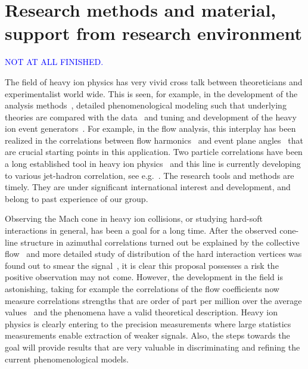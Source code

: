 \section{Research methods and material, support from research environment} %
\label{sec:researchmethods}

\textcolor{blue}{NOT AT ALL FINISHED.}

The field of heavy ion physics has very vivid cross talk between theoreticians and experimentalist world wide. This is seen, for example, in the development of the analysis methods~\cite{Poskanzer:1998yz,Bilandzic:2010jr}, detailed phenomenological modeling such that underlying theories are compared with the data~\cite{Burke:2013yra,Renk:2011gj,Niemi:2015qia} and tuning and development of the heavy ion event generators~\cite{Gyulassy:1994ew,Lin:2004en,Lokhtin2006}. For example, in the flow analysis, this interplay has been realized in the correlations between flow harmonics~\cite{Poskanzer:1998yz,ALICE:2011ab} and event plane angles~\cite{Aad:2014fla,Bhalerao:2014xra} that are crucial starting points in this application. Two particle correlations have been a long established tool in heavy ion physics~\cite{PhysRevLett.95.152301,PhysRevLett.97.052301} and this line is currently developing to various jet-hadron correlation, see e.g.~\cite{Khachatryan:2016tfj}. The research tools and methods are timely. They are under significant international interest and development, and belong to past experience of our group.

Observing the Mach cone in heavy ion collisions, or studying hard-soft interactions in general, has been a goal for a long time. After the observed cone-line structure in azimuthal correlations turned out be explained by the collective flow~\cite{ALICE:2011ab} and more detailed study of distribution of the hard interaction vertices was found out to smear the signal~\cite{Tachibana:2015qxa}, it is clear this proposal possesses a risk the positive observation may not come. However, the development in the field is astonishing, taking for example the correlations of the flow coefficients now measure correlations strengths that are order of part per million over the average values~\cite{ALICE:2016kpq} and the phenomena have a valid theoretical description. Heavy ion physics is clearly entering to the precision measurements where large statistics measurements enable extraction of weaker signals. Also, the steps towards the goal will provide results that are very valuable in discriminating and refining the current phenomenological models.

